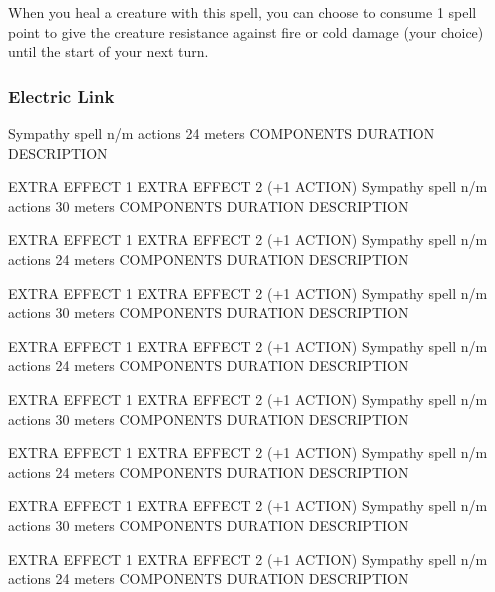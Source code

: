         When you heal a creature with this spell, you can choose to consume 1 spell point to give the creature resistance against fire or cold damage (your choice) until the start of your next turn.
\subsubsection{Electric Link}
        {Sympathy spell}
        {n/m actions}
        {24 meters}
        {COMPONENTS}
        {DURATION}
        DESCRIPTION

        EXTRA EFFECT 1
        EXTRA EFFECT 2 (+1 ACTION)
        {Sympathy spell}
        {n/m actions}
        {30 meters}
        {COMPONENTS}
        {DURATION}
        DESCRIPTION

        EXTRA EFFECT 1
        EXTRA EFFECT 2 (+1 ACTION)
        {Sympathy spell}
        {n/m actions}
        {24 meters}
        {COMPONENTS}
        {DURATION}
        DESCRIPTION

        EXTRA EFFECT 1
        EXTRA EFFECT 2 (+1 ACTION)
        {Sympathy spell}
        {n/m actions}
        {30 meters}
        {COMPONENTS}
        {DURATION}
        DESCRIPTION

        EXTRA EFFECT 1
        EXTRA EFFECT 2 (+1 ACTION)
        {Sympathy spell}
        {n/m actions}
        {24 meters}
        {COMPONENTS}
        {DURATION}
        DESCRIPTION

        EXTRA EFFECT 1
        EXTRA EFFECT 2 (+1 ACTION)
        {Sympathy spell}
        {n/m actions}
        {30 meters}
        {COMPONENTS}
        {DURATION}
        DESCRIPTION

        EXTRA EFFECT 1
        EXTRA EFFECT 2 (+1 ACTION)
        {Sympathy spell}
        {n/m actions}
        {24 meters}
        {COMPONENTS}
        {DURATION}
        DESCRIPTION

        EXTRA EFFECT 1
        EXTRA EFFECT 2 (+1 ACTION)
        {Sympathy spell}
        {n/m actions}
        {30 meters}
        {COMPONENTS}
        {DURATION}
        DESCRIPTION

        EXTRA EFFECT 1
        EXTRA EFFECT 2 (+1 ACTION)
        {Sympathy spell}
        {n/m actions}
        {24 meters}
        {COMPONENTS}
        {DURATION}
        DESCRIPTION

